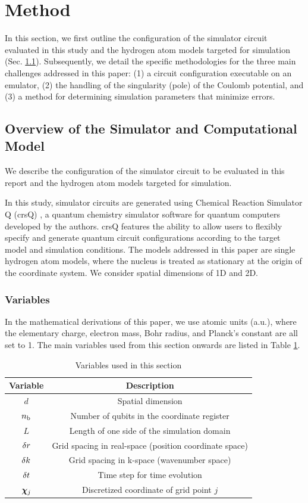 \documentclass[report_2025.tex]{subfiles}
\begin{document}
\section{Method}
\label{sec:method}
In this section, we first outline the configuration of the simulator circuit
evaluated in this study and the hydrogen atom models targeted for simulation
(Sec. \ref{subsec:simulator-model}). Subsequently, we detail the specific
methodologies for the three main challenges addressed in this paper: (1) a
circuit configuration executable on an emulator, (2) the handling of the
singularity (pole) of the Coulomb potential, and (3) a method for determining
simulation parameters that minimize errors.

\subsection{Overview of the Simulator and Computational Model}
\label{subsec:simulator-model}
We describe the configuration of the simulator circuit to be evaluated in this
report and the hydrogen atom models targeted for simulation.

In this study, simulator circuits are generated using Chemical Reaction
Simulator Q (crsQ) \cite{website:crsq}, a quantum chemistry simulator software
for quantum computers developed by the authors. crsQ features the ability to
allow users to flexibly specify and generate quantum circuit configurations
according to the target model and simulation conditions. The models addressed in
this paper are single hydrogen atom models, where the nucleus is treated as
stationary at the origin of the coordinate system. We consider spatial
dimensions of 1D and 2D.

\subsubsection{Variables}
In the mathematical derivations of this paper, we use atomic units (a.u.), where
the elementary charge, electron mass, Bohr radius, and Planck's constant are all
set to 1. The main variables used from this section onwards are listed in Table
\ref{tab:variables}.

\begin{table}[ht]
    \centering
    \caption{Variables used in this section}
    \begin{tabular}{cc}
        Variable & Description \\
        \hline
        $d$ & Spatial dimension \\
        $n_{\mathrm{b}}$ & Number of qubits in the coordinate register \\
        $L$ & Length of one side of the simulation domain \\
        $\delta r$ & Grid spacing in real-space (position coordinate space) \\
        $\delta k$ & Grid spacing in k-space (wavenumber space) \\
        $\delta t$ & Time step for time evolution \\
        $\bm{\chi}_{j}$ & Discretized coordinate of grid point $j$
    \end{tabular}
    \label{tab:variables}
\end{table}
\end{document}

